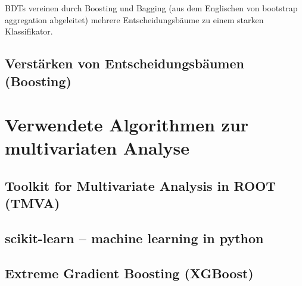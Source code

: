 BDTs vereinen durch Boosting und Bagging (aus dem Englischen von bootstrap aggregation abgeleitet) mehrere Entscheidungsb\"aume zu einem starken Klassifikator.

\subsection{Verst\"arken von Entscheidungsb\"aumen (Boosting)}
\label{ch:Algorithmen:subsec:Boosting}

\section{Verwendete Algorithmen zur multivariaten Analyse}
\label{ch:Algorithmen:subsec:Implementationen}

\subsection{Toolkit for Multivariate Analysis in ROOT (TMVA)}
\label{ch:Algorithmen:subsec:TMVA}

\subsection{scikit-learn -- machine learning in python}
\label{ch:Algorithmen:subsec:sklearn}

\subsection{Extreme Gradient Boosting (XGBoost)}
\label{ch:Algorithmen:subsec:XGB}
